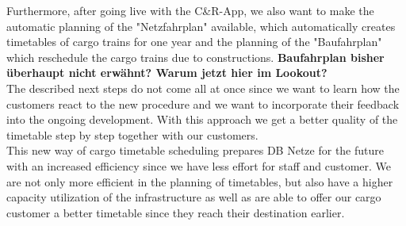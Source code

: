 Furthermore, after going live with the C\&R-App, we also want to make the automatic planning of the "Netzfahrplan" available, which automatically creates timetables of cargo trains for one year and the planning of the "Baufahrplan" which reschedule the cargo trains due to constructions. \textbf{Baufahrplan bisher überhaupt nicht erwähnt? Warum jetzt hier im Lookout?} \\
The described next steps do not come all at once since we want to learn how the customers react to the new procedure and we want to incorporate their feedback into the ongoing development. With this approach we get a better quality of the timetable step by step together with our customers. \\
This new way of cargo timetable scheduling prepares DB Netze for the future with an increased efficiency since we have less effort for staff and customer. We are not only more efficient in the planning of timetables, but also have a higher capacity utilization of the infrastructure as well as are able to offer our cargo customer a better timetable since they reach their destination earlier.   \\

